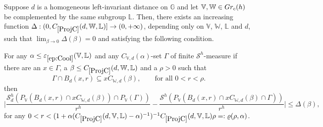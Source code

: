 \documentclass[10pt, a4paper,
oneside, headinclude,footinclude]{scrartcl}
\begin{document}
\begin{proposizione}\label{prop:EstimateOnProjection}
Suppose $d$ is a homogeneous left-invariant distance on $\mathbb{G}$ and let $\mathbb{V},\mathbb{W}\in Gr_c(h)$ be complemented by the same subgroup $\mathbb{L}$. Then, there exists an increasing function $\Delta:(0,\oldC{ProjC}(d,\mathbb W,\mathbb L)]\to(0,+\infty)$, depending only on $\mathbb{V}$, $\mathbb{W}$, $\mathbb{L}$ and $d$, such that $\lim_{\beta\to 0}\Delta(\beta)=0$ and satisfying the following condition.

For any $\alpha\leq\oldep{ep:Cool}(\mathbb V,\mathbb L)$ and any  $C_{\mathbb{V},d}(\alpha)$-set $\Gamma$ of finite $\mathcal{S}^h$-measure if there are an $x\in \Gamma$, a $\beta\leq\oldC{ProjC}(d,\mathbb W,\mathbb L)$ and a $\rho>0$ such that 
\begin{equation}\label{eqn:HypothesisOnW}
    \Gamma\cap B_d(x,r) \subseteq xC_{\mathbb{W},d}(\beta),\qquad\text{for all $0<r<\rho$.}
\end{equation}
then
\begin{equation}
    \Big\lvert\frac{\mathcal{S}_d^h(P_{\mathbb V}(B_d(x,r)\cap xC_{\mathbb W,d}(\beta))\cap P_{\mathbb V}(\Gamma))}{r^h}-\frac{\mathcal{S}^h(P_{\mathbb V}(B_d(x,r)\cap xC_{\mathbb W,d}(\beta)\cap \Gamma))}{r^h}\Big\rvert\leq \Delta(\beta),
    \nonumber
\end{equation}
for any $0<r<(1+\alpha(\oldC{ProjC}(d,\mathbb V,\mathbb L)-\alpha)^{-1})^{-1}\oldC{ProjC}(d,\mathbb V,\mathbb L)\rho=:\varrho(\rho,\alpha)$.
\end{proposizione}
\end{document}

